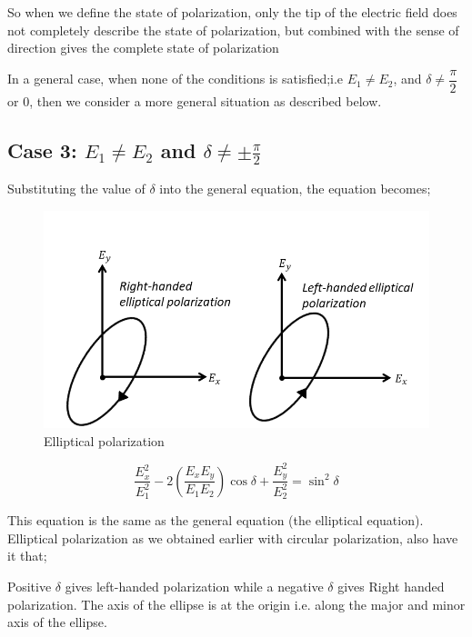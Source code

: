 So when we define the state of polarization, only the tip of the electric field does not completely describe the state of polarization, but combined with the sense of direction gives the complete state of polarization

In a general case, when none of the conditions is satisfied;i.e $ E_1 \neq E_2$, and $\delta\neq\dfrac{\pi}{2}$ or $ 0 $, then we consider a more general situation as described below.

\subsection{Case 3: \texorpdfstring{$E_1\neq E_2$}{E1≠E2} and \texorpdfstring{$\delta\neq\pm\frac{\pi}{2}$}{δ≠𝜆/2}}
Substituting the value of $\delta$ into the general equation, the equation becomes;
\begin{figure}[h]
\centering
\includegraphics[width=1\linewidth]{graphics/elliptical_polarization}
\caption{Elliptical polarization}
\end{figure}

\begin{equation}
\frac{E_{x}^2}{E_{1}^2} -2(\frac{E_{x}E_{y}}{E_{1}E_{2}})\cos\delta + \frac{E_{y}^2}{E_{2}^2} =\sin^2 \delta
\end{equation}

This equation is the same as the general equation (the elliptical equation). Elliptical polarization as we obtained earlier with circular polarization, also have it that;

Positive $\delta$ gives left-handed polarization while a negative $\delta$ gives Right handed polarization. The axis of the ellipse is at the origin i.e. along the major and minor axis of the ellipse.


